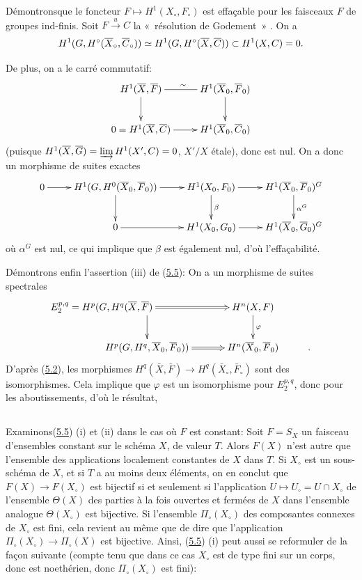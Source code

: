\documentclass[10pt]{../fichiers-configuration-latex/smfart}
\begin{document}
Démontrons\pageoriginale que le foncteur $F\mapsto
H^1(X_{\circ},F_{\circ})$ est effaçable pour les faisceaux $F$ de
groupes ind-finis. Soit $F\xrightarrow{u}C$ la « résolution de
Godement »  . On a
$$
H^1(G,H^{\circ}(\bar{X}_{\circ},
\bar{C}_{\circ}))\simeq H^1(G,H^{\circ}(\bar{X},\bar{C}))\subset
H^1(X,C)=0{\quoi}.
$$

De plus, on a le carré commutatif:
$$
\xymatrix{
H^{1}(\bar{X},\bar{F}) \ar@{-}[r]^{\sim} \ar[d]& H^{1}(\bar{X}_0,\bar{F}_0)\ar[d]\\
0 = H^{1}(\bar{X},\bar{C})  \ar[r]     & H^{1}(\bar{X}_0,\bar{C}_0)
}
$$
(puisque $H^1(\bar{X},\bar{G})=\varinjlim H^1(X',C)=0$, $X'/X$ étale),
donc est nul. On a donc un morphisme de suites exactes
$$
\xymatrix{
0 \ar[r] & H^{1}(G,H^{0}(\bar{X}_0, \bar{F}_0))  \ar[r] \ar[d]&
H^{1}(X_0,F_0) \ar[r] \ar[d]^{\beta}& H^{1}(\bar{X}_0,\bar{F}_0)^G \ar[d]^{\alpha^G}\\
&0  \ar[r] & H^{1}(X_0,G_0)  \ar[r] & H^{1}(\bar{X}_0,\bar{G}_0)^G
}
$$
où $\alpha^G$ est nul, ce qui implique que $\beta$ est également nul,
d'où l'effaçabilité.

Démontrons enfin l'assertion (iii) de (\hyperref[XII.cor5.5]{5.5}): On a un morphisme de
suites spectrales
$$
\xymatrix{
**[l]E_2^{p,q} = H^{p}(G,H^{q} (\bar{X},\bar{F})  \ar@{=>}[r] \ar[d]& H^{n}(X,F) \ar[d]^{\varphi}\\
H^{p}(G,H^q,\bar{X}_0,\bar{F}_0 ))     \ar@{=>}[r] &  H^{n}(\bar{X}_0,\bar{F}_0)&.
}
$$
D'après (\hyperref[XII.cor5.2]{5.2}), les morphismes $H^q(\bar{X},\bar{F})\rightarrow
H^q(\bar{X}_{\circ},\bar{F}_{\circ})$ sont des isomorphismes. Cela
implique que $\varphi$ est un isomorphisme pour $E^{p,q}_2$, donc
pour les aboutissements, d'où le résultat, \cqfd

\setcounter{subsection}{5}
\subsection{}
Examinons\pageoriginale (\hyperref[XII.cor5.5]{5.5}) (i) et (ii) dans le cas où $F$ est
constant: Soit $F=S_X$ un faisceau d'ensembles constant sur le schéma
$X$, de valeur $T$. Alors $F(X)$ n'est autre que l'ensemble des
applications localement constantes de $X$ dans $T$. Si $X_{\circ}$ est
un sous-schéma de $X$, et si $T$ a au moins deux éléments, on en
conclut que $F(X)\rightarrow F(X_{\circ})$ est bijectif si et
seulement si l'application $U\mapsto U_{\circ}=U\cap X_{\circ}$ de
l'ensemble $\Theta(X)$ des parties à la fois ouvertes et fermées de
$X$ dans l'ensemble analogue $\Theta(X_{\circ})$ est bijective. Si
l'ensemble $\Pi_{\circ}(X_{\circ})$ des composantes connexes de
$X_{\circ}$ est fini, cela revient au même que de dire que
l'application $\Pi_{\circ}(X_{\circ})\rightarrow \Pi_{\circ}(X)$ est
bijective. Ainsi, (\hyperref[XII.cor5.5]{5.5}) (i) peut aussi se reformuler de la façon
suivante (compte tenu que dans ce cas $X_{\circ}$ est de type fini sur
un corps, donc est noethérien, donc $\Pi_{\circ}(X_{\circ})$ est
fini):
\end{document}
